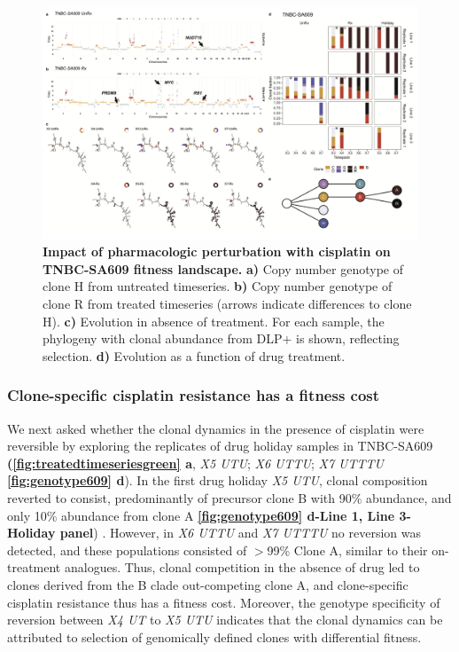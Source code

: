 \begin{figure}
\centering
\includegraphics[width=\textwidth]{Figures/chap4/genePlotSA609.png}
	
\caption[Impact of pharmacologic perturbation with cisplatin on TNBC-SA609 fitness landscape]
	{\small
	\textbf{Impact of pharmacologic perturbation with cisplatin on TNBC-SA609 fitness landscape.}
	 \textbf{a)} Copy number genotype of clone H from untreated timeseries. \textbf{b)} Copy number genotype of clone R from treated timeseries (arrows indicate differences to clone H). \textbf{c)}  Evolution in absence of treatment. For each sample, the phylogeny with clonal abundance from DLP+ is shown, reflecting selection. \textbf{d)} Evolution as a function of drug treatment.}
\label{fig:genotype609}
\end{figure}


\subsubsection {Clone-specific cisplatin resistance has a fitness cost}
We next asked whether the clonal dynamics in the presence of cisplatin were reversible by exploring the replicates of drug holiday samples in TNBC-SA609 \textbf{(\autoref{fig:treatedtimeseriesgreen} a}, \textit{X5 UTU}; \textit{X6 UTTU}; \textit{X7 UTTTU} \textbf{\autoref{fig:genotype609} d}). In the first drug holiday \textit{X5 UTU}, clonal composition reverted to consist, predominantly of precursor clone B with 90\% abundance, and only 10\% abundance from clone A \textbf{\autoref{fig:genotype609} d-Line 1, Line 3-Holiday panel}) . However, in \textit{X6 UTTU} and \textit{X7 UTTTU} no reversion was detected, and these populations consisted of $>$99\% Clone A, similar to their on-treatment analogues. Thus, clonal competition in the absence of drug led to clones derived from the B clade out-competing clone A, and clone-specific cisplatin resistance thus has a fitness cost. Moreover, the genotype specificity of reversion between \textit{X4 UT} to \textit{X5 UTU} indicates that the clonal dynamics can be attributed to selection of genomically defined clones with differential fitness. 


